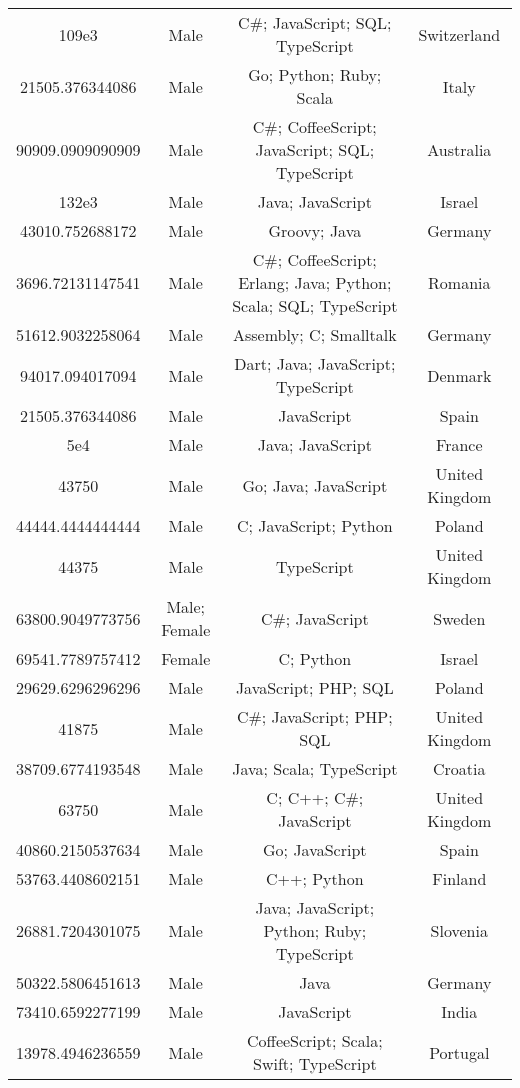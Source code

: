 \begin{center}
\begin{tabular}{ |c|c|c|c| }
109e3  &  Male  &  C\#; JavaScript; SQL; TypeScript  &  Switzerland  \\ 
21505.376344086  &  Male  &  Go; Python; Ruby; Scala  &  Italy  \\ 
90909.0909090909  &  Male  &  C\#; CoffeeScript; JavaScript; SQL; TypeScript  &  Australia  \\ 
132e3  &  Male  &  Java; JavaScript  &  Israel  \\ 
43010.752688172  &  Male  &  Groovy; Java  &  Germany  \\ 
3696.72131147541  &  Male  &  C\#; CoffeeScript; Erlang; Java; Python; Scala; SQL; TypeScript  &  Romania  \\ 
51612.9032258064  &  Male  &  Assembly; C; Smalltalk  &  Germany  \\ 
94017.094017094  &  Male  &  Dart; Java; JavaScript; TypeScript  &  Denmark  \\ 
21505.376344086  &  Male  &  JavaScript  &  Spain  \\ 
5e4  &  Male  &  Java; JavaScript  &  France  \\ 
43750  &  Male  &  Go; Java; JavaScript  &  United Kingdom  \\ 
44444.4444444444  &  Male  &  C; JavaScript; Python  &  Poland  \\ 
44375  &  Male  &  TypeScript  &  United Kingdom  \\ 
63800.9049773756  &  Male; Female  &  C\#; JavaScript  &  Sweden  \\ 
69541.7789757412  &  Female  &  C; Python  &  Israel  \\ 
29629.6296296296  &  Male  &  JavaScript; PHP; SQL  &  Poland  \\ 
41875  &  Male  &  C\#; JavaScript; PHP; SQL  &  United Kingdom  \\ 
38709.6774193548  &  Male  &  Java; Scala; TypeScript  &  Croatia  \\ 
63750  &  Male  &  C; C++; C\#; JavaScript  &  United Kingdom  \\ 
40860.2150537634  &  Male  &  Go; JavaScript  &  Spain  \\ 
53763.4408602151  &  Male  &  C++; Python  &  Finland  \\ 
26881.7204301075  &  Male  &  Java; JavaScript; Python; Ruby; TypeScript  &  Slovenia  \\ 
50322.5806451613  &  Male  &  Java  &  Germany  \\ 
73410.6592277199  &  Male  &  JavaScript  &  India  \\ 
13978.4946236559  &  Male  &  CoffeeScript; Scala; Swift; TypeScript  &  Portugal  \\ 

\end{tabular}
\end{center}
